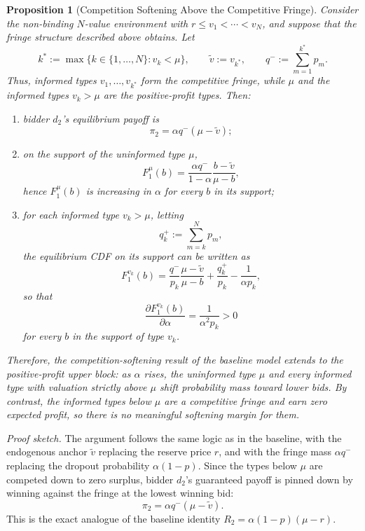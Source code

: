 \documentclass[11pt]{article}
\theoremstyle{plain}
\theoremstyle{definition}
\theoremstyle{plain}
\theoremstyle{plain}
\theoremstyle{plain}
\theoremstyle{plain}
\newtheorem{prop}[thm]{Proposition}
\numberwithin{equation}{section}
\begin{document}
\begin{prop}[Competition Softening Above the Competitive Fringe]\label{prop:nonbinding-N-softening}
Consider the non-binding $N$-value environment with $r \leq v_1 < \cdots < v_N$, and suppose that the fringe structure described above obtains. Let
\[
k^* := \max\{k \in \{1,\ldots,N\} : v_k < \mu\}, \qquad \tilde{v} := v_{k^*}, \qquad q^- := \sum_{m=1}^{k^*} p_m.
\]
Thus, informed types $v_1,\ldots,v_{k^*}$ form the competitive fringe, while $\mu$ and the informed types $v_k > \mu$ are the positive-profit types. Then:
\begin{enumerate}
    \item bidder $d_2$'s equilibrium payoff is
    \[
    \pi_2 = \alpha q^- (\mu - \tilde{v});
    \]

    \item on the support of the uninformed type $\mu$,
    \[
    F_1^{\mu}(b) = \frac{\alpha q^-}{1-\alpha}\frac{b-\tilde{v}}{\mu-b},
    \]
    hence $F_1^{\mu}(b)$ is increasing in $\alpha$ for every $b$ in its support;

    \item for each informed type $v_k > \mu$, letting
    \[
    q_k^+ := \sum_{m=k}^{N} p_m,
    \]
    the equilibrium CDF on its support can be written as
    \[
    F_1^{v_k}(b) = \frac{q^-}{p_k}\frac{\mu-\tilde{v}}{\mu-b} + \frac{q_k^+}{p_k} - \frac{1}{\alpha p_k},
    \]
    so that
    \[
    \frac{\partial F_1^{v_k}(b)}{\partial \alpha} = \frac{1}{\alpha^2 p_k} > 0
    \]
    for every $b$ in the support of type $v_k$.
\end{enumerate}
Therefore, the competition-softening result of the baseline model extends to the positive-profit upper block: as $\alpha$ rises, the uninformed type $\mu$ and every informed type with valuation strictly above $\mu$ shift probability mass toward lower bids. By contrast, the informed types below $\mu$ are a competitive fringe and earn zero expected profit, so there is no meaningful softening margin for them.
\end{prop}
\vspace{0.2cm}

\noindent \emph{Proof sketch.} The argument follows the same logic as in the baseline, with the endogenous anchor $\tilde{v}$ replacing the reserve price $r$, and with the fringe mass $\alpha q^-$ replacing the dropout probability $\alpha(1-p)$. Since the types below $\mu$ are competed down to zero surplus, bidder $d_2$'s guaranteed payoff is pinned down by winning against the fringe at the lowest winning bid:
\[
\pi_2 = \alpha q^- (\mu-\tilde{v}).
\]
This is the exact analogue of the baseline identity $R_2 = \alpha(1-p)(\mu-r)$.
\vspace{2mm}
\end{document}
